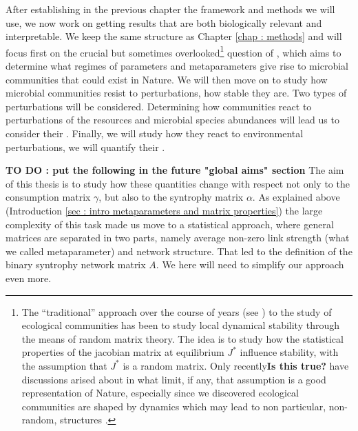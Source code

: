\documentclass[12pt]{report}
\begin{document}
After establishing in the previous chapter the framework and methods we will use, we now work on getting results that are both biologically relevant and interpretable. We keep the same structure as Chapter \ref{chap : methods} and will focus first on the crucial but sometimes overlooked\footnote{The ``traditional'' approach over the course of years (see \eg \cite{may_will_1972}) to the study of ecological communities has been to study local dynamical stability through the means of random matrix theory. The idea is to study how the statistical properties of the jacobian matrix at equilibrium $J^*$ influence stability, with the assumption that $J^*$ is a random matrix. Only recently\textbf{Is this true?} have discussions arised \cite{allesina_stabilitycomplexity_2015, rohr_structural_2014} about in what limit, if any, that assumption is a good representation of Nature, especially since we discovered ecological communities are shaped by dynamics which may lead to non particular, non-random, structures \cite{bascompte_nested_2003, bastolla_architecture_2009, bonsall_life_2004, thebault_stability_2010}.} question of , which aims to determine what regimes of parameters and metaparameters give rise to microbial communities that could exist in Nature. We will then move on to study how microbial communities resist to perturbations, \ie how stable they are. Two types of perturbations will be considered. Determining how communities react to perturbations of the resources and microbial species abundances will lead us to consider their . Finally, we will study how they react to environmental perturbations, \ie we will quantify their .

\textbf{TO DO : put the following in the future "global aims" section}
The aim of this thesis is to study how these quantities change with respect not only to the consumption matrix $\gamma$, but also to the syntrophy matrix $\alpha$. As explained above (Introduction \ref{sec : intro metaparameters and matrix properties}) the large complexity of this task made us move to a statistical approach, where general matrices are separated in two parts, namely average non-zero link strength (what we called metaparameter) and network structure. That led to the definition of the binary syntrophy network matrix $A$. We here will need to simplify our approach even more.
\end{document}
